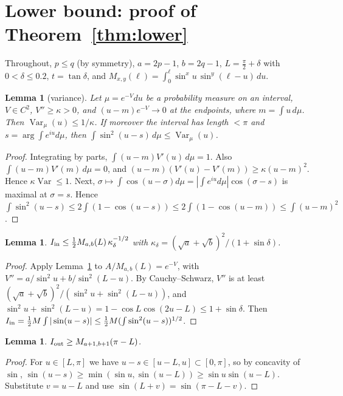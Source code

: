 \documentclass[11pt]{amsart}
\newtheorem{lemma}[theorem]{Lemma}
\theoremstyle{definition}
\begin{document}
\section{Lower bound: proof of Theorem~\ref{thm:lower}}

Throughout, $p\le q$ (by symmetry), $a=2p-1$, $b=2q-1$, $L=\frac\pi2+\delta$ with $0<\delta\le0.2$, $t=\tan\delta$, and
$M_{x,y}(\ell)=\int_0^\ell\sin^xu\,\sin^y(\ell-u)\,du$.

\begin{lemma}[variance]\label{lem:var}
Let $\mu=e^{-V}du$ be a probability measure on an interval, $V\in C^2$, $V''\ge\kappa>0$, and $(u-m)e^{-V}\to0$ at the endpoints,
where $m=\int u\,d\mu$. Then $\operatorname{Var}_\mu(u)\le1/\kappa$. If moreover the interval has length $<\pi$ and $s=\arg\int e^{iu}d\mu$,
then $\int\sin^2(u-s)\,d\mu\le\operatorname{Var}_\mu(u)$.
\end{lemma}
\begin{proof}
Integrating by parts, $\int(u-m)V'(u)\,d\mu=1$. Also $\int(u-m)V'(m)\,d\mu=0$, and $(u-m)(V'(u)-V'(m))\ge\kappa(u-m)^2$. Hence
$\kappa\operatorname{Var}\le1$. Next, $\sigma\mapsto\int\cos(u-\sigma)d\mu=|\int e^{iu}d\mu|\cos(\sigma-s)$ is maximal at $\sigma=s$. Hence
$\int\sin^2(u-s)\le2\int(1-\cos(u-s))\le2\int(1-\cos(u-m))\le\int(u-m)^2$.
\end{proof}

\begin{lemma}\label{lem:Iin}
$I_{\rm in}\le\frac12M_{a,b}(L)\,\kappa_\delta^{-1/2}$ with $\kappa_\delta=(\sqrt a+\sqrt b)^2/(1+\sin\delta)$.
\end{lemma}
\begin{proof}
Apply Lemma~\ref{lem:var} to $A/M_{a,b}(L)=e^{-V}$, with $V''=a/\sin^2u+b/\sin^2(L-u)$. By Cauchy--Schwarz, $V''$ is at least
$(\sqrt a+\sqrt b)^2/(\sin^2u+\sin^2(L-u))$, and $\sin^2u+\sin^2(L-u)=1-\cos L\cos(2u-L)\le1+\sin\delta$. Then
$I_{\rm in}=\frac12M\int|\sin(u-s)|\le\frac12M(\int\sin^2(u-s))^{1/2}$.
\end{proof}

\begin{lemma}\label{lem:Iout}
$I_{\rm out}\ge M_{a+1,b+1}(\pi-L)$.
\end{lemma}
\begin{proof}
For $u\in[L,\pi]$ we have $u-s\in[u-L,u]\subset[0,\pi]$, so by concavity of $\sin$,
$\sin(u-s)\ge\min(\sin u,\sin(u-L))\ge\sin u\sin(u-L)$. Substitute $v=u-L$ and use $\sin(L+v)=\sin(\pi-L-v)$.
\end{proof}
\end{document}
